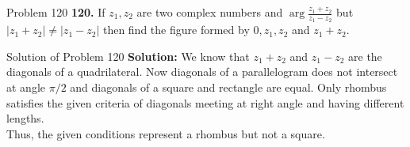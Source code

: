 \documentclass[aspectratio=169,8pt]{beamer}
\begin{document}
\begin{frame}{Problem 120}
  \textbf{120.} If $z_1, z_2$ are two complex numbers and $\arg\frac{z_1 + z_2}{z_1 - z_2}$ but $|z_1 + z_2|\neq |z_1 - z_2|$ then
  find the figure formed by $0, z_1, z_2$ and $z_1 + z_2.$
\end{frame}
\begin{frame}{Solution of Problem 120}
  \textbf{Solution:} We know that $z_1 + z_2$ and $z_1 - z_2$ are the diagonals of a quadrilateral. Now diagonals of a parallelogram
  does not intersect at angle $\pi/2$ and diagonals of a square and rectangle are equal. Only rhombus satisfies the given criteria
  of diagonals meeting at right angle and having different lengths.\\
  \vspace*{0.2cm}
  Thus, the given conditions represent a rhombus but not a square.
\end{frame}
\end{document}
